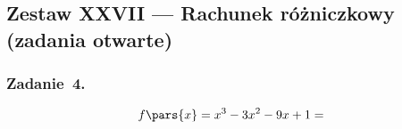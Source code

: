 \subsection*{Zestaw XXVII --- Rachunek różniczkowy (zadania otwarte)}
\subsubsection*{Zadanie~4.}
\begin{equation*}
    f\pars{x}
        = x^3 - 3x^2 - 9x + 1
        =
\end{equation*}
